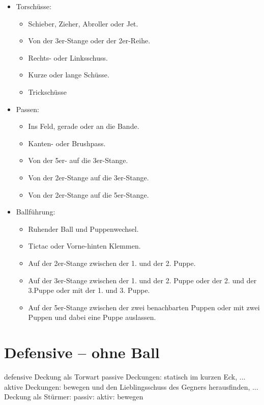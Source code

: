 \begin{itemize}
\item Torschüsse: 
\begin{itemize}
\item Schieber, Zieher, Abroller oder Jet.
\item Von der 3er-Stange oder der 2er-Reihe.
\item Rechts- oder Linksschuss.
\item Kurze oder lange Schüsse.
\item Trickschüsse
\end{itemize}
\item Passen:
\begin{itemize}
\item Ins Feld, gerade oder an die Bande.
\item Kanten- oder Brushpass.
\item Von der 5er- auf die 3er-Stange.
\item Von der 2er-Stange auf die 3er-Stange.
\item Von der 2er-Stange auf die 5er-Stange.
\end{itemize}
\item Ballführung: 
\begin{itemize}
\item Ruhender Ball und Puppenwechsel.
\item Tictac oder Vorne-hinten Klemmen.
\item Auf der 2er-Stange zwischen der 1. und der 2. Puppe.
\item Auf der 3er-Stange zwischen der 1. und der 2. Puppe oder der 2. und der 3.Puppe oder mit der 1. und 3. Puppe.
\item Auf der 5er-Stange zwischen der zwei benachbarten Puppen oder mit zwei Puppen und dabei eine Puppe auslassen.
\end{itemize}
\end{itemize}

\section{Defensive -- ohne Ball}
\label{technik:defensive}


\gls{defensive}
Deckung als Torwart
passive Deckungen: statisch im kurzen Eck, ...
aktive Deckungen: bewegen und den Lieblingsschuss des Gegners herausfinden, ...
Deckung als Stürmer:
passiv: 
aktiv: bewegen


